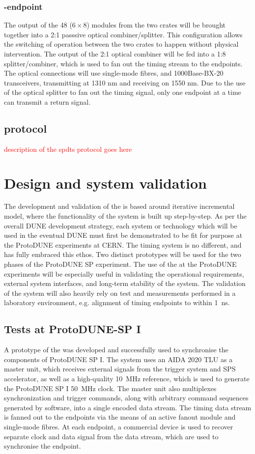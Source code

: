 \documentclass{article}
\begin{document}
\subsubsection{-endpoint}
The output of the 48 ($6\times8$)  modules from the two  crates will be brought together into a 2:1 passsive optical combiner/splitter. This configuration allows the switching of operation between the two crates to happen without physical intervention. The output of the 2:1 optical combiner will be fed into a 1:8 splitter/combiner, which is used to fan out the  timing stream to the endpoints. The optical connections will use single-mode fibres, and 1000Base-BX-20  transceivers, transmitting at 1310 nm and receiving on 1550 nm. Due to the use of the optical splitter to fan out the timing signal, only one endpoint at a time can transmit a return signal.
\subsection{ protocol}
\textcolor{red}{description of the spdts protocol goes here}
\section{Design and system validation}
The development and validation of the  is based around iterative incremental model, where the functionality of the system is built up step-by-step. As per the overall DUNE development strategy, each system or technology  which will be used in the eventual DUNE  must first be demonstrated to be fit for purpose at the ProtoDUNE experiments at CERN. The timing system is no different, and has fully embraced this ethos. Two distinct  prototypes will be used for the two phases of the ProtoDUNE SP experiment. The use of the  at the ProtoDUNE experiments will be especially useful in validating the operational requirements, external system interfaces, and long-term stability of the system. The validation of the  system will also heavily rely on test and measurements performed in a laboratory environment, e.g. alignment of timing endpoints to within \SI{1}{ns}. 

\subsection{Tests at ProtoDUNE-SP I}
A prototype of the  was developed and successfully used to synchronise the components of ProtoDUNE SP I. The system uses an AIDA 2020 TLU as a master unit, which receives external signals from the trigger system and SPS accelerator, as well as a high-quality \SI{10}{\MHz} reference, which is used to generate the ProtoDUNE SP I \SI{50}{\MHz} clock. The master unit also multiplexes synchronization and trigger commands, along with arbitrary command
sequences generated by software, into a single encoded data stream. The timing data stream is fanned out to the endpoints via the means of an active fanout module and single-mode fibres. At each endpoint, a commercial  device is used to recover separate clock and data signal from the data stream, which are used to synchronise the endpoint.
\end{document}
